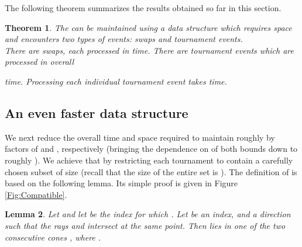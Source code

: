 \documentclass[letter,11pt]{article}
\newtheorem{theorem}{Theorem}[section]
\newtheorem{lemma}[theorem]{Lemma}
\begin{document}
The following theorem summarizes the results obtained so far in this section.

\begin{theorem}
The   can be maintained using a data structure which
requires 
 space
 and encounters two types of
events: swaps and tournament events.\\ 
There are  swaps, 
each processed in  time. 
There are
  tournament 
events which are processed in overall
 
time.
Processing each individual tournament event takes   time.
\end{theorem}


\subsection{An even faster data structure}\label{Subsec:ReducedMaintenImprove}

We next reduce the overall time and space required to maintain 
roughly by factors of  and , respectively (bringing the dependence on  of both bounds down to roughly ).  We achieve that by
restricting each tournament  to contain a carefully chosen
subset  of size  (recall that the size of the entire set  is ).
The definition of  is based on
the following lemma. Its simple proof is given in Figure \ref{Fig:Compatible}.

\begin{lemma}\label{Lemma:Compatible}
Let  and let  be the index for which 
. Let  be an index, and  a direction such that
the rays  and  intersect
 at the same point. 
Then  lies in one of the two consecutive cones , where .
\end{lemma}
\end{document}
